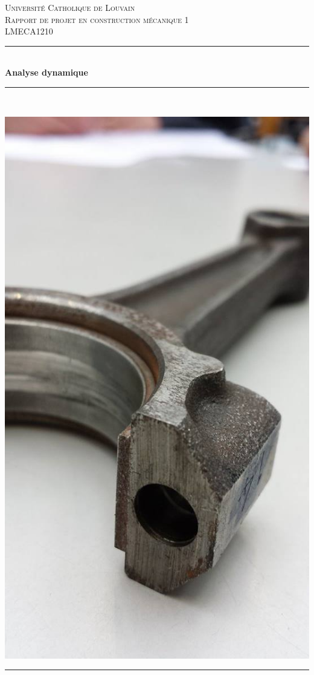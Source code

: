 \documentclass{article}
\newcommand{\HRule}{\rule{\linewidth}{0.5mm}}
\begin{document}
\begin{titlepage}

\begin{center}


\textsc{\Large Université Catholique de Louvain}\\[0.5cm]

\textsc{\LARGE Rapport de projet en construction mécanique 1}\\[0.2cm]
\textsc{\LARGE LMECA1210}\\[0.2cm]

\HRule \\[0.2cm]
{\huge \bfseries Analyse dynamique}\\
\HRule \\[0.2cm]

\begin{center}
\includegraphics[trim=0cm 8cm 0cm 5cm, clip, width= 15 cm, height= 13 cm ]{Schema/bielle2.jpg}
\end{center}
\HRule \\[0 cm]


\begin{minipage}{0.4\textwidth}
\begin{flushleft} \large

\begin{tabular}{l l}


\end{tabular}
\end{flushleft}
\end{minipage}
\end{center}
\end{titlepage}
\end{document}
